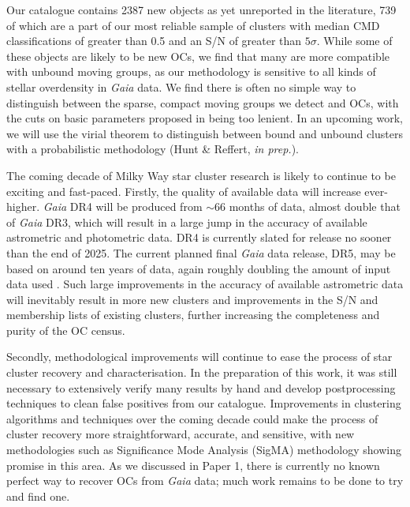 Our catalogue contains 2387 new objects as yet unreported in the literature, 739 of which are a part of our most reliable sample of clusters with median CMD classifications of greater than 0.5 and an S/N of greater than $5\sigma$. While some of these objects are likely to be new OCs, we find that many are more compatible with unbound moving groups, as our methodology is sensitive to all kinds of stellar overdensity in \emph{Gaia} data. We find there is often no simple way to distinguish between the sparse, compact moving groups we detect and OCs, with the cuts on basic parameters proposed in \cite{cantat-gaudin_clusters_2020} being too lenient. In an upcoming work, we will use the virial theorem to distinguish between bound and unbound clusters with a probabilistic methodology (Hunt \& Reffert, \emph{in prep.}).

The coming decade of Milky Way star cluster research is likely to continue to be exciting and fast-paced. Firstly, the quality of available data will increase ever-higher. \emph{Gaia} DR4 will be produced from $\sim$66 months of data, almost double that of \emph{Gaia} DR3, which will result in a large jump in the accuracy of available astrometric and photometric data. DR4 is currently slated for release no sooner than the end of 2025. The current planned final \emph{Gaia} data release, DR5, may be based on around ten years of data, again roughly doubling the amount of input data used \citep{gaia_collaboration_gaia_2021}. Such large improvements in the accuracy of available astrometric data will inevitably result in more new clusters and improvements in the S/N and membership lists of existing clusters, further increasing the completeness and purity of the OC census.

Secondly, methodological improvements will continue to ease the process of star cluster recovery and characterisation. In the preparation of this work, it was still necessary to extensively verify many results by hand and develop postprocessing techniques to clean false positives from our catalogue. Improvements in clustering algorithms and techniques over the coming decade could make the process of cluster recovery more straightforward, accurate, and sensitive, with new methodologies such as Significance Mode Analysis (SigMA) methodology \citep{ratzenbock_significance_2022-1} showing promise in this area. As we discussed in Paper 1, there is currently no known perfect way to recover OCs from \emph{Gaia} data; much work remains to be done to try and find one.


